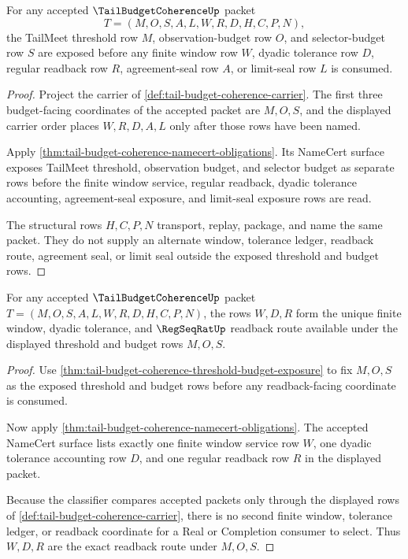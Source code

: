 \begin{theorem}
\label{thm:tail-budget-coherence-threshold-budget-exposure}
For any accepted $\TailBudgetCoherenceUp$ packet
$$
T=(M,O,S,A,L,W,R,D,H,C,P,N),
$$
the TailMeet threshold row $M$, observation-budget row $O$, and selector-budget row $S$ are exposed before any finite window row $W$, dyadic tolerance row $D$, regular readback row $R$, agreement-seal row $A$, or limit-seal row $L$ is consumed.
\end{theorem}
\begin{proof}
Project the carrier of \autoref{def:tail-budget-coherence-carrier}. The first three budget-facing coordinates of the accepted packet are $M,O,S$, and the displayed carrier order places $W,R,D,A,L$ only after those rows have been named.

Apply \autoref{thm:tail-budget-coherence-namecert-obligations}. Its NameCert surface exposes TailMeet threshold, observation budget, and selector budget as separate rows before the finite window service, regular readback, dyadic tolerance accounting, agreement-seal exposure, and limit-seal exposure rows are read.

The structural rows $H,C,P,N$ transport, replay, package, and name the same packet. They do not supply an alternate window, tolerance ledger, readback route, agreement seal, or limit seal outside the exposed threshold and budget rows.
\end{proof}

\begin{theorem}
\label{thm:tail-budget-coherence-window-readback-exactness}
For any accepted $\TailBudgetCoherenceUp$ packet $T=(M,O,S,A,L,W,R,D,H,C,P,N)$, the rows $W,D,R$ form the unique finite window, dyadic tolerance, and $\RegSeqRatUp$ readback route available under the displayed threshold and budget rows $M,O,S$.
\end{theorem}
\begin{proof}
Use \autoref{thm:tail-budget-coherence-threshold-budget-exposure} to fix $M,O,S$ as the exposed threshold and budget rows before any readback-facing coordinate is consumed.

Now apply \autoref{thm:tail-budget-coherence-namecert-obligations}. The accepted NameCert surface lists exactly one finite window service row $W$, one dyadic tolerance accounting row $D$, and one regular readback row $R$ in the displayed packet.

Because the classifier compares accepted packets only through the displayed rows of \autoref{def:tail-budget-coherence-carrier}, there is no second finite window, tolerance ledger, or readback coordinate for a Real or Completion consumer to select. Thus $W,D,R$ are the exact readback route under $M,O,S$.
\end{proof}

